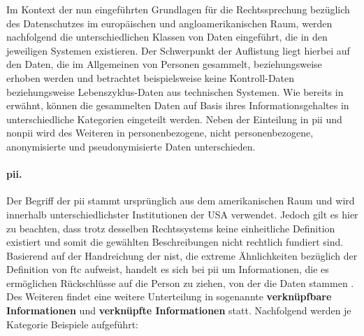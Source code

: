 Im Kontext der nun eingeführten Grundlagen für die Rechtssprechung bezüglich des Datenschutzes im europäischen und angloamerikanischen Raum, werden nachfolgend die unterschiedlichen Klassen von Daten eingeführt, die in den jeweiligen Systemen existieren. Der Schwerpunkt der Auflistung liegt hierbei auf den Daten, die im Allgemeinen von Personen gesammelt, beziehungsweise erhoben werden und betrachtet beispielsweise keine Kontroll-Daten beziehungsweise Lebenszyklus-Daten aus technischen Systemen. Wie bereits in  erwähnt, können die gesammelten Daten auf Basis ihres Informationsgehaltes in unterschiedliche Kategorien eingeteilt werden. Neben der Einteilung in \ac{pii} und \ac{nonpii} wird des Weiteren in personenbezogene, nicht personenbezogene, anonymisierte und pseudonymisierte Daten unterschieden.


\paragraph{\acf{pii}.}
\label{sec:Grundlagen:para:Personal Identifiable Information}
Der Begriff der \ac{pii} stammt ursprünglich aus dem amerikanischen Raum und wird innerhalb unterschiedlichster Institutionen der USA verwendet. Jedoch gilt es hier zu beachten, dass trotz desselben Rechtssystems keine einheitliche Definition existiert und somit die gewählten Beschreibungen nicht rechtlich fundiert sind. Basierend auf der Handreichung der \ac{nist}, die extreme Ähnlichkeiten bezüglich der Definition von \ac{ftc} aufweist, handelt es sich bei \acs{pii} um Informationen, die es ermöglichen Rückschlüsse auf die Person zu ziehen, von der die Daten stammen \cite{PiwikPro2022,NIST2010}. Des Weiteren findet eine weitere Unterteilung in sogenannte \textbf{verknüpfbare Informationen} und \textbf{verknüpfte Informationen} statt. Nachfolgend werden je Kategorie Beispiele aufgeführt:

